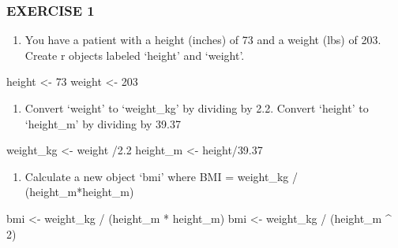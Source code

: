 \documentclass[]{article}
\newenvironment{Shaded}{\begin{snugshade}}{\end{snugshade}}
\newcommand{\DecValTok}[1]{\textcolor[rgb]{0.00,0.00,0.81}{{#1}}}
\newcommand{\FloatTok}[1]{\textcolor[rgb]{0.00,0.00,0.81}{{#1}}}
\newcommand{\StringTok}[1]{\textcolor[rgb]{0.31,0.60,0.02}{{#1}}}
\newcommand{\NormalTok}[1]{{#1}}
\providecommand{\tightlist}{%
  \setlength{\itemsep}{0pt}\setlength{\parskip}{0pt}}
\begin{document}
\subsubsection{EXERCISE 1}\label{exercise-1}

\begin{enumerate}
\def\labelenumi{\arabic{enumi}.}
\tightlist
\item
  You have a patient with a height (inches) of 73 and a weight (lbs) of
  203. Create r objects labeled `height' and `weight'.
\end{enumerate}

\begin{Shaded}
\begin{Highlighting}[]
\NormalTok{height <-}\StringTok{ }\DecValTok{73}
\NormalTok{weight <-}\StringTok{ }\DecValTok{203}
\end{Highlighting}
\end{Shaded}

\begin{enumerate}
\def\labelenumi{\arabic{enumi}.}
\setcounter{enumi}{1}
\tightlist
\item
  Convert `weight' to `weight\_kg' by dividing by 2.2. Convert `height'
  to `height\_m' by dividing by 39.37
\end{enumerate}

\begin{Shaded}
\begin{Highlighting}[]
\NormalTok{weight_kg <-}\StringTok{ }\NormalTok{weight /}\FloatTok{2.2}
\NormalTok{height_m <-}\StringTok{ }\NormalTok{height/}\FloatTok{39.37}
\end{Highlighting}
\end{Shaded}

\begin{enumerate}
\def\labelenumi{\arabic{enumi}.}
\setcounter{enumi}{2}
\tightlist
\item
  Calculate a new object `bmi' where BMI = weight\_kg /
  (height\_m*height\_m)
\end{enumerate}

\begin{Shaded}
\begin{Highlighting}[]
\NormalTok{bmi <-}\StringTok{ }\NormalTok{weight_kg /}\StringTok{ }\NormalTok{(height_m *}\StringTok{ }\NormalTok{height_m)}
\NormalTok{bmi <-}\StringTok{ }\NormalTok{weight_kg /}\StringTok{ }\NormalTok{(height_m ^}\StringTok{ }\DecValTok{2}\NormalTok{)}
\end{Highlighting}
\end{Shaded}
\end{document}
